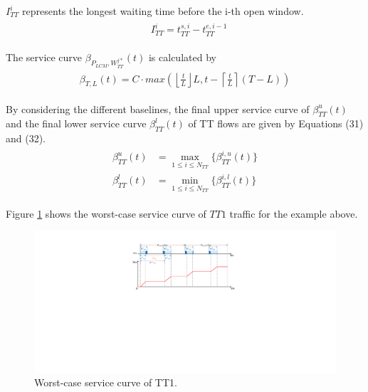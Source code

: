\documentclass[electronics,article,accept,moreauthors,pdftex]{Definitions/mdpi}
\begin{document}
 $I^i_{TT}$ represents the longest waiting time before the i-th open window.
\begin{gather}
\begin{align}
&	I^{i}_{TT} = t^{s,i}_{TT} - t^{e,i-1}_{TT}
\end{align}
\end{gather}

The service curve $\beta_{P_{LCM},W^{j*}_{TT}}(t)$ is calculated by
\begin{gather}
\begin{aligned}
 	\beta_{T,L}(t) = C \cdot max(\left \lfloor \frac{t}{L} \right \rfloor L,t-\left \lceil \frac{t}{L} \right \rceil(T-L))
\end{aligned}
\end{gather}

By considering the different baselines, the final upper service curve of $\beta^u_{TT}(t)$ and the final lower service curve
$\beta^l_{TT}(t)$ of TT flows are given by Equations (31) and (32).
\begin{gather}
\begin{align}
	\beta^u_{TT}(t) &= \max_{1\leq i\leq N_{TT}} \{ \beta^{i,u}_{TT}(t)\}  \\
	\beta^l_{TT}(t) &= \min_{1\leq i\leq N_{TT}} \{ \beta^{i,l}_{TT}(t) \}
\end{align}
\end{gather}

{Figure} \ref{ser} shows the worst-case service curve of $TT1$ traffic for the example above.

\begin{figure}[H]
\centering
\includegraphics[scale=0.4]{figures/service}
\caption{Worst-case service curve of TT1.}
\label{ser}
\end{figure}
\end{document}
